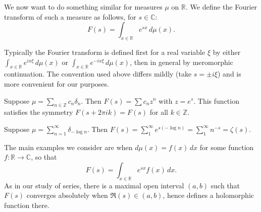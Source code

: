 \documentclass[reqno]{amsart}  \numberwithin{theorem}{section} \numberwithin{equation}{section}
\begin{document}
We now want to do something similar for measures $\mu$ on $\mathbb{R}$. We define the Fourier transform of such a measure as follows, for $s \in \mathbb{C}$:
\begin{equation*}
  F(s) = \int_{x \in \mathbb{R} } e^{s x } \, d \mu (x).
\end{equation*}
\begin{remark}
  Typically the Fourier transform is defined first for a real variable $\xi$ by either $\int_{x \in \mathbb{R} } e^{i x \xi } \, d \mu(x)$ or $\int_{x \in \mathbb{R} } e^{-i x \xi } \, d \mu(x)$, then in general by meromorphic continuation.  The convention used above differs mildly (take $s = \pm i \xi$) and is more convenient for our purposes.
\end{remark}
\begin{example}
  Suppose $\mu = \sum_{n \in \mathbb{Z} } c_n \delta_n$.  Then $F (s) = \sum c_n z^n$ with $z = e^s$.  This function satisfies the symmetry $F (s + 2 \pi i k) = F (s)$ for all $k \in \mathbb{Z}$.
\end{example}
\begin{example}
  Suppose $\mu = \sum_{n =1 }^\infty \delta_{- \log n}$.  Then $F (s) = \sum_1^\infty e^{s (- \log n )} = \sum_1^\infty n^{- s} = \zeta(s)$.
\end{example}
The main examples we consider are when $d \mu (x) = f (x) \, d x$ for some function $f : \mathbb{R} \rightarrow \mathbb{C}$, so that
\begin{equation*}
  F (s) = \int_{x \in \mathbb{R} } e^{s x } f (x) \, d x.
\end{equation*}
As in our study of series, there is a maximal open interval $(a,b)$ such that $F (s)$ converges absolutely when $\Re(s) \in (a,b)$, hence defines a holomorphic function there.
\end{document}
